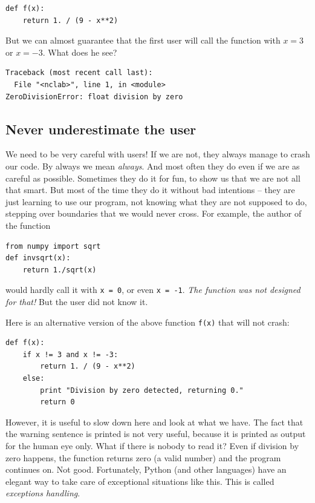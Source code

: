 \begin{verbatim}
def f(x):
    return 1. / (9 - x**2)
\end{verbatim}
But we can almost guarantee that the first user will call the 
function with $x = 3$ or $x = -3$. What does he see?

\begin{verbatim}
Traceback (most recent call last):
  File "<nclab>", line 1, in <module>
ZeroDivisionError: float division by zero
\end{verbatim}

\subsection{Never underestimate the user}

We need to be very careful with users! If we are not, they always manage
to crash our code. By always we mean {\em always}. And most often they do even
if we are as careful as possible. Sometimes they do it for fun, to show us that we are not all that smart.
But most of the time they do it without bad intentions -- they are just learning to use our
program, not knowing what they are not supposed to do, stepping over boundaries that we would 
never cross. For example, the author of the function 

\begin{verbatim}
from numpy import sqrt
def invsqrt(x):
    return 1./sqrt(x)
\end{verbatim}
would hardly call it with {\tt x = 0}, or even {\tt x = -1}. {\em The function 
was not designed for that!} But the user did not know it.

Here is an alternative version of the above function {\tt f(x)} that will not crash:

\begin{verbatim}
def f(x):
    if x != 3 and x != -3:
        return 1. / (9 - x**2)
    else:
        print "Division by zero detected, returning 0."
        return 0
\end{verbatim}
However, it is useful to slow down here and look at what we have. The fact that
the warning sentence is printed is not very useful, because it is printed as output for 
the human eye only. What if there is nobody to read it? Even if division by zero 
happens, the function returns zero (a valid number) and the program continues on.
Not good. Fortunately,
Python (and other languages) have an elegant way to take care of exceptional situations 
like this. This is called {\em exceptions handling}.


